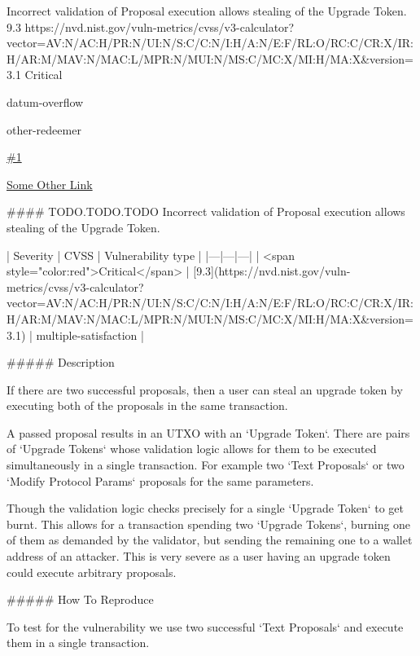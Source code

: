 \vuln
    { %
    Incorrect validation of Proposal execution allows stealing of the Upgrade Token.
    }
    { %
      9.3
    }
    { %
    https://nvd.nist.gov/vuln-metrics/cvss/v3-calculator?vector=AV:N/AC:H/PR:N/UI:N/S:C/C:N/I:H/A:N/E:F/RL:O/RC:C/CR:X/IR:H/AR:M/MAV:N/MAC:L/MPR:N/MUI:N/MS:C/MC:X/MI:H/MA:X&version=3.1
    }
    { %
    Critical
    }
    { %
    \item datum-overflow
    \item other-redeemer
    }
    { %
      \lipsum[2]
    }
    { %
      \lipsum[1]
    }
    { %
      \lipsum[1]
    }
    { %
    \item\href{github.com}{\#1}
    \item\href{github.com}{Some Other Link}
    }



#### TODO.TODO.TODO Incorrect validation of Proposal execution allows stealing of the Upgrade Token.

| Severity | CVSS | Vulnerability type |
|---|---|---|
| <span style="color:red">Critical</span> | [9.3](https://nvd.nist.gov/vuln-metrics/cvss/v3-calculator?vector=AV:N/AC:H/PR:N/UI:N/S:C/C:N/I:H/A:N/E:F/RL:O/RC:C/CR:X/IR:H/AR:M/MAV:N/MAC:L/MPR:N/MUI:N/MS:C/MC:X/MI:H/MA:X&version=3.1) | multiple-satisfaction |

##### Description

If there are two successful proposals, then a user can steal an upgrade token by executing both of the proposals in the same transaction. 

A passed proposal results in an UTXO with an `Upgrade Token`. There are pairs of `Upgrade Tokens` whose validation logic allows for them to be executed simultaneously in a single transaction. For example two `Text Proposals` or two `Modify Protocol Params` proposals for the same parameters.

Though the validation logic checks precisely for a single `Upgrade Token` to get burnt. This allows for a transaction spending two `Upgrade Tokens`, burning one of them as demanded by the validator, but sending the remaining one to a wallet address of an attacker. This is very severe as a user having an upgrade token could execute arbitrary proposals.

##### How To Reproduce

To test for the vulnerability we use two successful `Text Proposals` and execute them in a single transaction. 

